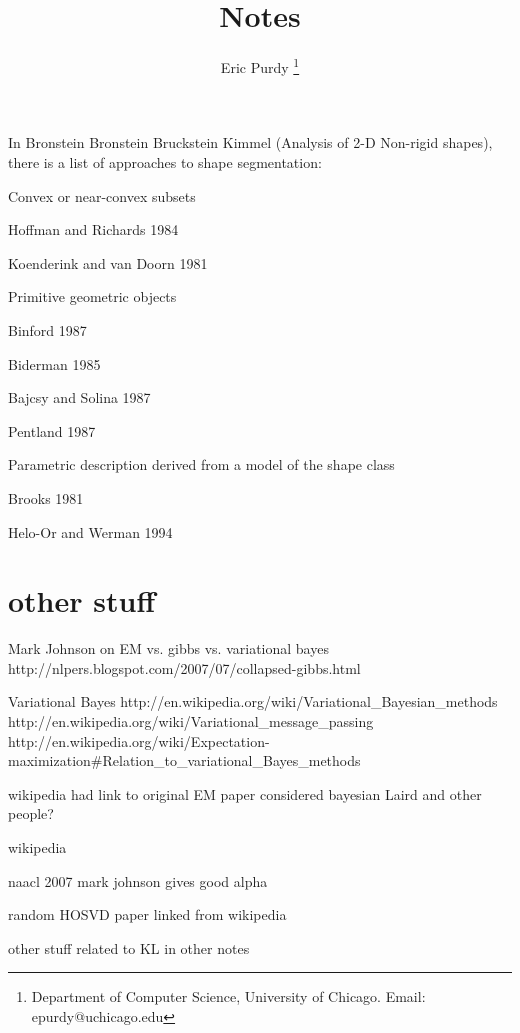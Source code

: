\documentclass{article}
\title{Notes}
\author{Eric Purdy \footnote{Department of Computer Science, University of Chicago. Email: epurdy@uchicago.edu}}
\begin{document}
\maketitle

In Bronstein Bronstein Bruckstein Kimmel (Analysis of 2-D Non-rigid
shapes), there is a list of approaches to shape segmentation:

\bitem
\item Convex or near-convex subsets 
\bitem
\item Hoffman and Richards 1984
\item Koenderink and van Doorn 1981
\eitem
\item Primitive geometric objects
\bitem
\item Binford 1987
\item Biderman 1985
\item Bajcsy and Solina 1987
\item Pentland 1987
\eitem
\item Parametric description derived from a model of the shape class
\bitem
\item Brooks 1981
\item Helo-Or and Werman 1994
\eitem
\eitem

\section{other stuff}

Mark Johnson on EM vs. gibbs vs. variational bayes
http://nlpers.blogspot.com/2007/07/collapsed-gibbs.html

Variational Bayes
http://en.wikipedia.org/wiki/Variational_Bayesian_methods
http://en.wikipedia.org/wiki/Variational_message_passing
http://en.wikipedia.org/wiki/Expectation-maximization#Relation_to_variational_Bayes_methods

wikipedia had link to original EM paper considered bayesian
Laird and other people?

wikipedia

naacl 2007 mark johnson gives good alpha

random HOSVD paper linked from wikipedia

other stuff related to KL in other notes
\end{document}
